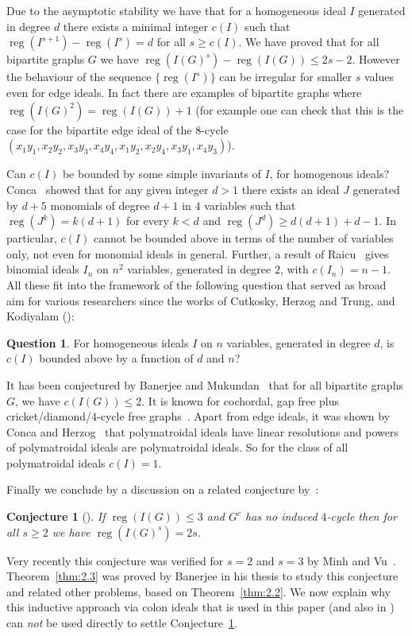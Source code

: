 \documentclass[10pt]{article}
\newtheorem{conj}[theorem]{Conjecture}
\theoremstyle{definition}
\newtheorem{question}[theorem]{Question}
\numberwithin{equation}{section}
\newcommand \reg{\operatorname{reg}}
\begin{document}
 Due to the asymptotic stability we have that for a homogeneous ideal $I$ generated in degree $d$ there exists a minimal integer $c(I)$ such that $\reg(I^{s+1})-\reg(I^s)=d$ for all $s\geq c(I)$. 
 We have proved that for all bipartite graphs $G$ we have $\reg(I(G)^s)- \reg(I(G)) \leq 2s-2$. 
 However the behaviour of the sequence $\{\reg(I^s)\}$ can be irregular for smaller $s$ values even for edge ideals. In fact there are examples of bipartite graphs where $\reg(I(G)^2)=\reg(I(G)) +1$ (for example one can check that this is the case for the bipartite edge ideal of the 8-cycle  $(x_1y_1,x_2y_2,x_3y_3,x_4y_4,x_1y_2,x_2y_4,x_3y_1,x_4y_3)$).

 Can $c(I)$ be bounded by some simple invariants of $I$, for homogenous ideals?
  Conca~\cite{Conca} showed that for any given integer $d > 1$ there exists an ideal $J$ generated by $d+5$ monomials of degree $d + 1$ in $4$ variables such that $\reg(J^k) = k(d + 1)$ for every $k <d$ and $\reg(J^d) \geq d(d + 1) + d-1$. In particular, $c(I)$ cannot be bounded above in terms of the number of variables only, not even for monomial ideals in general. Further, a result of Raicu~\cite{Raicu} gives binomial ideals $I_n$ on $n^2$ variables, generated in degree $2$, with $c(I_n)=n-1$. All these fit into the framework of the following question that served as broad aim for various researchers
since the works of Cutkosky, Herzog and Trung, and Kodiyalam (\cite{BBH17,Conca,CH03,CHT, huneke,ha_adam2,HHZ, JS18,vijay,Nevo, nevo_peeva}):

\begin{question}
For homogeneous ideals $I$ on $n$ variables, generated in degree $d$, is $c(I)$ bounded above by a function of $d$ and $n$?
\end{question}

 It has been conjectured by Banerjee and Mukundan~\cite{arindam_vivek} that for all bipartite graphs $G$, we have $c(I(G)) \leq 2$. 
 It is known  for cochordal, gap free plus cricket/diamond/$4$-cycle free graphs~\cite{banerjee,HHZ,Er1,Er2}. Apart from edge ideals, it was shown by Conca and Herzog~\cite{CH03} that polymatroidal ideals have linear resolutions and powers of polymatroidal ideals are polymatroidal ideals. So for the class of all polymatroidal ideals $c(I)=1$.

Finally we conclude by a discussion on a related conjecture by~\cite{nevo_peeva}:

\begin{conj}[{\cite{nevo_peeva}}]\label{conj:Nevo-Peeva}
If $\reg(I(G)) \leq 3$ and $G^c$ has no induced $4$-cycle then for all $s \geq 2$ we have $\reg (I(G)^s) =2s$.
\end{conj}
Very recently this conjecture was verified for $s=2$ and $s=3$ by Minh and Vu~\cite{minh_vu2}.
 Theorem~\ref{thm:2.3} was proved by Banerjee in his thesis to study this conjecture and related other problems, based on Theorem~\ref{thm:2.2}.
We now explain why this inductive approach via colon ideals that is used in this paper (and also in \cite{banerjee1,banerjee,BBH17,Nevo,nevo_peeva,jayanthan,JS18}) can \emph{not} be used directly to settle Conjecture~\ref{conj:Nevo-Peeva}.
\end{document}
